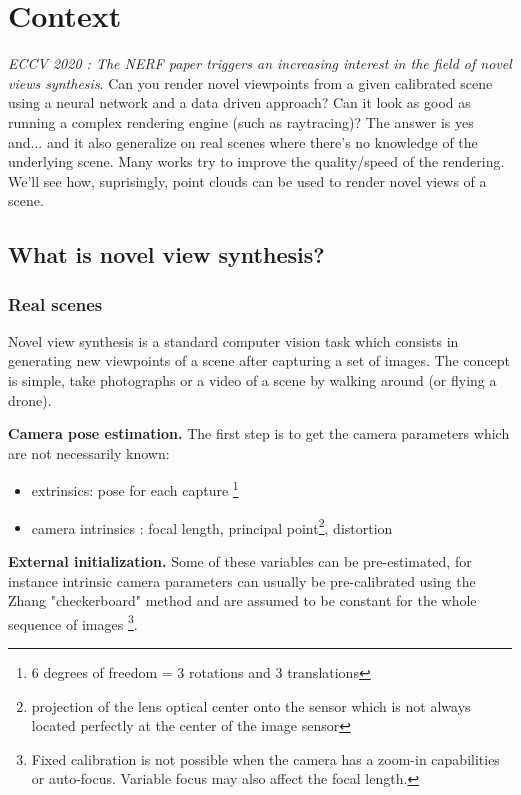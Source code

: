 \section{Context}
\label{sec:Context}

\textit{ECCV 2020 : The NERF \cite{mildenhall2020nerf} paper triggers an increasing interest in the field of novel views synthesis}. Can you render novel viewpoints from a given calibrated scene using a neural network and a data driven approach? Can it look as good as running a complex rendering engine (such as raytracing)? The answer is yes and... and it also generalize on real scenes where there's no knowledge of the underlying scene. Many works try to improve the quality/speed of the rendering. We'll see how, suprisingly, point clouds can be used to render novel views of a scene.


\subsection{What is novel view synthesis?}
\label{sec:novel_view_synthesis}


\subsubsection{Real scenes}
\label{sec:real_scenes}
Novel view synthesis is a standard computer vision task which consists in generating new viewpoints of a scene after capturing a set of images.
The concept is simple, take photographs or a video of a scene by walking around (or flying a drone).

\noindent \textbf{Camera pose estimation.} The first step is to get the camera parameters which are not necessarily known: 

\begin{itemize}
    \item extrinsics: pose for each capture \footnote{6 degrees of freedom = 3 rotations and 3 translations}
    \item camera intrinsics : focal length, principal point\footnote{projection of the lens optical center onto the sensor which is not always located perfectly at the center of the image sensor}, distortion
\end{itemize}

\noindent \textbf{External initialization.} Some of these variables can be pre-estimated, for instance intrinsic camera parameters can usually be pre-calibrated using the Zhang "checkerboard" method \cite{Zhang00calib} and are assumed to be constant for the whole sequence of images \footnote{Fixed calibration is not possible when the camera has a zoom-in capabilities or auto-focus. Variable focus may also affect the focal length.}.

